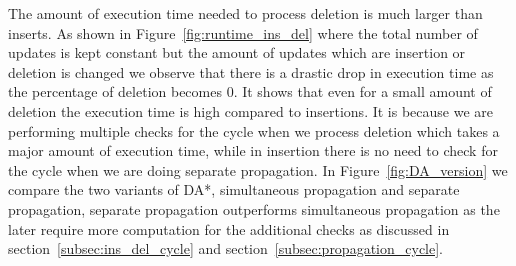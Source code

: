 \documentclass[a4paper]{article}
\begin{document}
The amount of execution time needed to process deletion is much larger than inserts. As shown in Figure~\ref{fig:runtime_ins_del} where the total number of updates is kept constant but the amount of updates which are insertion or deletion is changed we observe that there is a drastic drop in execution time as the percentage of deletion becomes 0. It shows that even for a small amount of deletion the execution time is high compared to insertions. It is because we are performing multiple checks for the cycle when we process deletion which takes a major amount of execution time, while in insertion there is no need to check for the cycle when we are doing separate propagation. In Figure~\ref{fig:DA_version} we compare the two variants of DA*, simultaneous propagation and separate propagation, separate propagation outperforms simultaneous propagation as the later require more computation for the additional checks as discussed in section~\ref{subsec:ins_del_cycle} and section~\ref{subsec:propagation_cycle}.
\end{document}
